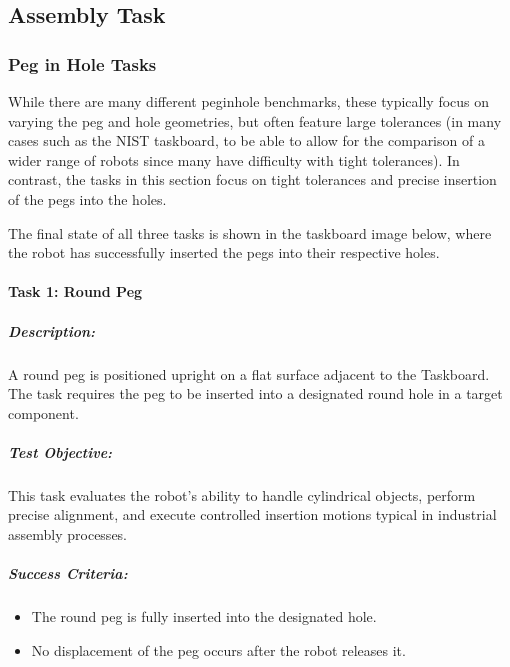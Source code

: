 \documentclass[letterpaper,10pt,english]{sphinxmanual}
\let\sphinxpxdimen\pdfpxdimen\else\newdimen\sphinxpxdimen
\begin{document}
\subsection{Assembly Task}
\label{\detokenize{wbk_challenge_robot_tasks_overview:assembly-task}}
\sphinxstepscope


\subsubsection{Peg in Hole Tasks}
\label{\detokenize{robotic_instructions_peg_in_hole:peg-in-hole-tasks}}\label{\detokenize{robotic_instructions_peg_in_hole::doc}}
\sphinxAtStartPar
While there are many different peg\sphinxhyphen{}in\sphinxhyphen{}hole benchmarks, these typically focus on varying the peg and hole geometries,
but often feature large tolerances (in many cases such as the NIST taskboard, to be able to allow for the comparison of a wider range of robots since many have difficulty with tight tolerances).
In contrast, the tasks in this section focus on tight tolerances and precise insertion of the pegs into the holes.

\sphinxAtStartPar
The final state of all three tasks is shown in the taskboard image below,
where the robot has successfully inserted the pegs into their respective holes.

\noindent{\hspace*{\fill}\sphinxincludegraphics[width=400\sphinxpxdimen]{{peg_in_hole_taskboard_finished}.png}\hspace*{\fill}}


\paragraph{Task 1: Round Peg}
\label{\detokenize{robotic_instructions_peg_in_hole:task-1-round-peg}}

\subparagraph{Description:}
\label{\detokenize{robotic_instructions_peg_in_hole:description}}
\sphinxAtStartPar
A round peg is positioned upright on a flat surface adjacent to the Taskboard.
The task requires the peg to be inserted into a designated round hole in a target component.


\subparagraph{Test Objective:}
\label{\detokenize{robotic_instructions_peg_in_hole:test-objective}}
\sphinxAtStartPar
This task evaluates the robot’s ability to handle cylindrical objects, perform precise alignment,
and execute controlled insertion motions typical in industrial assembly processes.


\subparagraph{Success Criteria:}
\label{\detokenize{robotic_instructions_peg_in_hole:success-criteria}}\begin{itemize}
\item {} 
\sphinxAtStartPar
The round peg is fully inserted into the designated hole.

\item {} 
\sphinxAtStartPar
No displacement of the peg occurs after the robot releases it.

\end{itemize}
\end{document}
